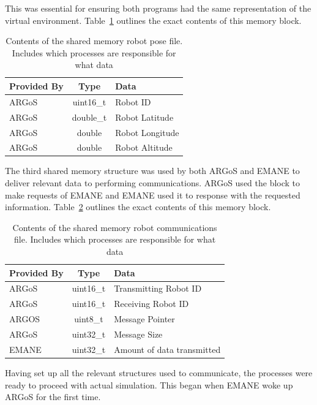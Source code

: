 This was essential for ensuring both programs had the same representation of the virtual environment.
Table~\ref{shm_pose} outlines the exact contents of this memory block.
\begin{table}[!ht]
\centering
\caption{Contents of the shared memory robot pose file. Includes which processes are responsible for what data}
\begin{adjustbox}{width=0.6\textwidth, center=\textwidth}
	\begin{tabular}{l|c|l}
		\multicolumn{1}{c|}{Provided By} & Type & Data \\ 
		\hline
		ARGoS & uint16\_t & Robot ID \\
		ARGoS & double\_t & Robot Latitude \\
		ARGoS & double & Robot Longitude \\
		ARGoS & double & Robot Altitude
	\end{tabular}
\end{adjustbox}
\label{shm_pose}
\end{table}
The third shared memory structure was used by both ARGoS and EMANE to deliver relevant data to performing communications.
ARGoS used the block to make requests of EMANE and EMANE used it to response with the requested information.
Table~\ref{shm_comms} outlines the exact contents of this memory block.\par
\begin{table}[!ht]
\centering
\caption{Contents of the shared memory robot communications file. Includes which processes are responsible for what data}
\begin{adjustbox}{width=0.7\textwidth, center=\textwidth}
	\begin{tabular}{l|c|l}
		\multicolumn{1}{c|}{Provided By} & Type & Data \\ 
		\hline
		ARGoS & uint16\_t & Transmitting Robot ID \\
		ARGoS & uint16\_t & Receiving Robot ID \\
		ARGOS & uint8\_t\* & Message Pointer \\
		ARGoS & uint32\_t & Message Size \\
		EMANE & uint32\_t & Amount of data transmitted
	\end{tabular}
\end{adjustbox}
\label{shm_comms}
\end{table}
Having set up all the relevant structures used to communicate, the processes were ready to proceed with actual simulation.
This began when EMANE woke up ARGoS for the first time.
